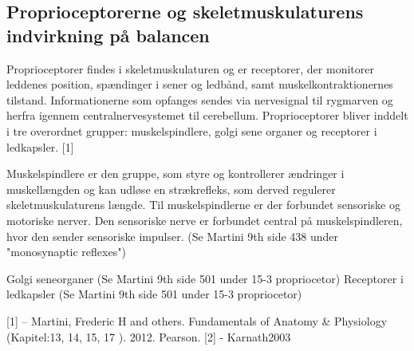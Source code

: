 
\subsection{Proprioceptorerne og skeletmuskulaturens indvirkning på balancen}
Proprioceptorer findes i skeletmuskulaturen og er receptorer, der monitorer leddenes position, spændinger i sener og ledbånd, samt muskelkontraktionernes tilstand. Informationerne som opfanges sendes via nervesignal til rygmarven og herfra igennem centralnervesystemet til cerebellum. Proprioceptorer bliver inddelt i tre overordnet grupper: muskelspindlere, golgi sene organer og receptorer i ledkapsler. [1]

Muskelspindlere er den gruppe, som styre og kontrollerer ændringer i muskellængden og kan udløse en strækrefleks, som derved regulerer skeletmuskulaturens længde. Til muskelspindlerne er der forbundet sensoriske og motoriske nerver. Den sensoriske nerve er forbundet central på muskelspindleren, hvor den sender sensoriske impulser.  (Se Martini 9th side 438 under "monosynaptic reflexes")  

Golgi seneorganer (Se Martini 9th side 501 under 15-3 propriocetor)
Receptorer i ledkapsler (Se Martini 9th side 501 under 15-3 propriocetor)



[1] – Martini, Frederic H and others. Fundamentals of Anatomy & Physiology (Kapitel:13, 14, 15, 17 ). 2012. Pearson. 
[2] - Karnath2003

